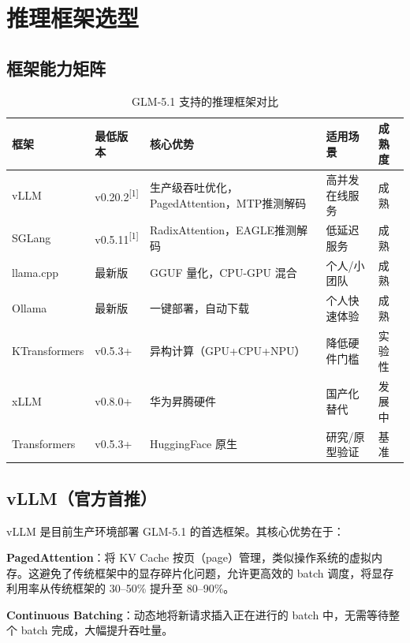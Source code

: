 \documentclass[UTF8,a4paper,10pt,oneside]{ctexart}
\begin{document}

\section{推理框架选型}

\subsection{框架能力矩阵}

\begin{table}[htbp]
\centering
\caption{GLM-5.1 支持的推理框架对比}
\begin{tabular}{p{2.5cm}p{2cm}p{3cm}p{2.8cm}p{1.8cm}}
\hline
\textbf{框架} & \textbf{最低版本} & \textbf{核心优势} & \textbf{适用场景} & \textbf{成熟度} \\
\hline
vLLM & v0.20.2\textsuperscript{[1]} & 生产级吞吐优化，PagedAttention，MTP推测解码 & 高并发在线服务 & 成熟 \\
SGLang & v0.5.11\textsuperscript{[1]} & RadixAttention，EAGLE推测解码 & 低延迟服务 & 成熟 \\
llama.cpp & 最新版 & GGUF 量化，CPU-GPU 混合 & 个人/小团队 & 成熟 \\
Ollama & 最新版 & 一键部署，自动下载 & 个人快速体验 & 成熟 \\
KTransformers & v0.5.3+ & 异构计算（GPU+CPU+NPU） & 降低硬件门槛 & 实验性 \\
xLLM & v0.8.0+ & 华为昇腾硬件 & 国产化替代 & 发展中 \\
Transformers & v0.5.3+ & HuggingFace 原生 & 研究/原型验证 & 基准 \\
\hline
\end{tabular}
\end{table}

\subsection{vLLM（官方首推）}

vLLM 是目前生产环境部署 GLM-5.1 的首选框架。其核心优势在于：

\textbf{PagedAttention}：将 KV Cache 按页（page）管理，类似操作系统的虚拟内存。这避免了传统框架中的显存碎片化问题，允许更高效的 batch 调度，将显存利用率从传统框架的 30--50\% 提升至 80--90\%。

\textbf{Continuous Batching}：动态地将新请求插入正在进行的 batch 中，无需等待整个 batch 完成，大幅提升吞吐量。
\end{document}
